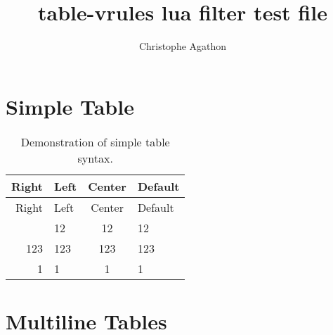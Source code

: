 \documentclass[
]{article}
\title{table-vrules lua filter test file}
\author{Christophe Agathon}
\date{}
\begin{document}
\maketitle

\section{Simple Table}\label{simple-table}

\begin{longtable}[]{|r|l|c|l|}
\caption{Demonstration of simple table syntax.}\tabularnewline
\toprule\noalign{}
Right & Left & Center & Default \\
\midrule\noalign{}
\endfirsthead
\toprule\noalign{}
Right & Left & Center & Default \\
\midrule\noalign{}
\endhead
\bottomrule\noalign{}
\endlastfoot
12 & 12 & 12 & 12 \\
\midrule
123 & 123 & 123 & 123 \\
\midrule
1 & 1 & 1 & 1 \\
\end{longtable}

\section{Multiline Tables}\label{multiline-tables}
\end{document}
